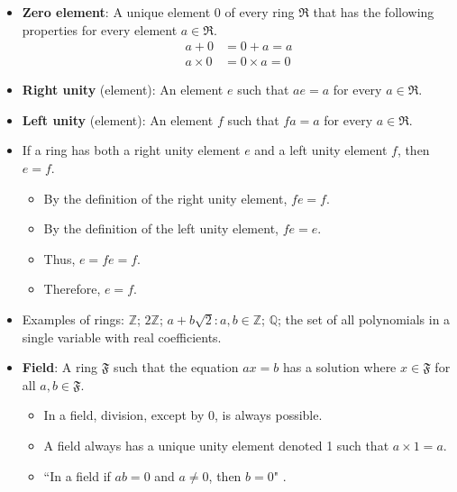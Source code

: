 \documentclass[titlepage]{article}
\numberwithin{figure}{section}
\numberwithin{equation}{section}
\numberwithin{theorem}{section}
\newcommand{\dq}[4][]{``#2"#1 \cite[#4]{#3}.}
\begin{document}
\begin{itemize}
    \item \textbf{Zero element}: A unique element 0 of every ring $\mathfrak{R}$ that has the following properties for every element $a\in\mathfrak{R}$.
    \begin{align*}
        a+0 &= 0+a = a\\
        a\times 0 &= 0\times a = 0
    \end{align*}
    \item \textbf{Right unity} (element): An element $e$ such that $ae=a$ for every $a\in\mathfrak{R}$.
    \item \textbf{Left unity} (element): An element $f$ such that $fa=a$ for every $a\in\mathfrak{R}$.
    \item If a ring has both a right unity element $e$ and a left unity element $f$, then $e=f$.
    \begin{itemize}
        \item By the definition of the right unity element, $fe=f$.
        \item By the definition of the left unity element, $fe=e$.
        \item Thus, $e=fe=f$.
        \item Therefore, $e=f$.
    \end{itemize}
    \item Examples of rings: $\mathbb{Z}$; $2\mathbb{Z}$; $a+b\sqrt{2}:a,b\in\mathbb{Z}$; $\mathbb{Q}$; the set of all polynomials in a single variable with real coefficients.
    \item \textbf{Field}: A ring $\mathfrak{F}$ such that the equation $ax=b$ has a solution where $x\in\mathfrak{F}$ for all $a,b\in\mathfrak{F}$.
    \begin{itemize}
        \item In a field, division, except by 0, is always possible.
        \item A field always has a unique unity element denoted 1 such that $a\times 1=a$.
        \item \dq{In a field if $ab=0$ and $a\neq 0$, then $b=0$}{bib:determinants}{4}
    \end{itemize}
\end{itemize}
\end{document}
